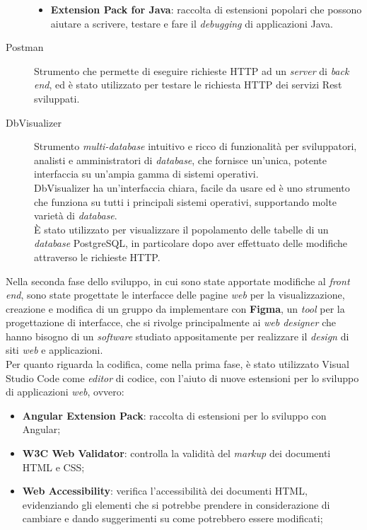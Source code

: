 \begin{description}
\begin{itemize}
                  \item \textbf{Extension Pack for Java}: raccolta di
                        estensioni popolari
                        che possono aiutare a scrivere, testare e fare il
                        \textit{debugging} di applicazioni Java.
            \end{itemize}
      \item[Postman]
            Strumento che permette di eseguire richieste HTTP ad un
            \textit{server} di \textit{back end}, ed è stato utilizzato per
            testare le richiesta HTTP dei servizi Rest sviluppati.
      \item[DbVisualizer] Strumento \textit{multi-database} intuitivo e ricco
            di
            funzionalità per sviluppatori, analisti e amministratori di
            \textit{database},
            che fornisce un'unica, potente interfaccia su un'ampia gamma di
            sistemi
            operativi. \\
            DbVisualizer ha un'interfaccia chiara, facile da usare ed è uno
            strumento
            che
            funziona su tutti i principali sistemi operativi, supportando molte
            varietà di
            \textit{database}. \\
            È stato utilizzato per visualizzare il popolamento delle tabelle
            di un \textit{database} PostgreSQL, in particolare dopo aver
            effettuato delle modifiche attraverso le richieste HTTP.
\end{description}

\noindent Nella seconda fase dello sviluppo, in cui sono state apportate
modifiche al
\textit{front end}, sono state progettate le interfacce delle pagine
\textit{web} per la visualizzazione, creazione e modifica di un gruppo da
implementare con \textbf{Figma}, un \textit{tool} per la progettazione di
interfacce, che si rivolge principalmente ai \textit{web designer} che hanno bisogno di un
\textit{software} studiato appositamente per realizzare il \textit{design} di
siti \textit{web} e applicazioni.\\

\noindent Per quanto riguarda la codifica, come nella prima fase, è stato
utilizzato Visual Studio
Code come \textit{editor} di codice, con l'aiuto di nuove estensioni per lo
sviluppo di applicazioni \textit{web}, ovvero:
\begin{itemize}
      \item \textbf{Angular Extension Pack}: raccolta di
            estensioni per lo sviluppo con Angular;
      \item \textbf{W3C Web Validator}: controlla la validità del
            \textit{markup} dei documenti HTML e CSS;
      \item \textbf{Web Accessibility}: verifica l'accessibilità
            dei documenti HTML, evidenziando gli elementi che si
            potrebbe prendere in considerazione di cambiare e dando
            suggerimenti su come potrebbero essere modificati;
\end{itemize}


